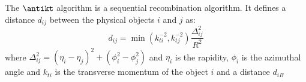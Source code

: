 The $\antikt$ algorithm is a sequential recombination algorithm. It defines a
distance $d_{ij}$ between the physical objects $i$ and $j$ as:
\begin{equation}
  \label{eq:80}
  d_{ij} = \min(k_{ti}^{-2}, k_{tj}^{-2}) \frac{\Delta_{ij}^2}{R^2}
\end{equation}
where $\Delta_{ij}^2 = (\eta_i - \eta_j)^2 + (\phi_i^2 - \phi_j^2)$ and $\eta_i$
is the rapidity, $\phi_i$ is the azimuthal angle and $k_{ti}$ is the transverse
momentum of the object $i$ and a distance $d_{iB}$
